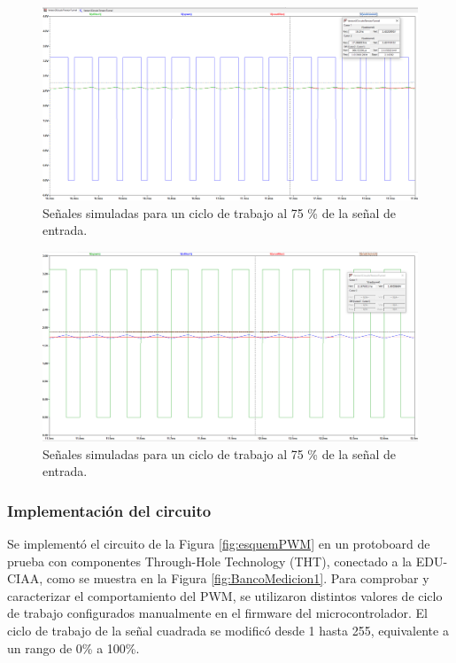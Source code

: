\begin{figure}[H]
    \centering
    \includegraphics[width=1.1\linewidth]{Figuras/datalogger/Hardware/pwm75Percent.png}
    \caption{Señales simuladas para un ciclo de trabajo al 75 \% de la señal de entrada.}
    \label{fig:pwm75Percent}
\end{figure}



\begin{figure}[H]
    \centering
    \includegraphics[width=1.1\linewidth]{Figuras/datalogger/Hardware/pwm55Percent.png}
    \caption{Señales simuladas para un ciclo de trabajo al 75 \% de la señal de entrada.}
    \label{fig:pwm55Percent}
\end{figure}


\subsubsection{Implementación del circuito}

Se implementó el circuito de la Figura \ref{fig:esquemPWM} en un protoboard de prueba con componentes Through-Hole Technology (THT), conectado a la EDU-CIAA, como se muestra en la Figura \ref{fig:BancoMedicion1}. Para comprobar y caracterizar el comportamiento del PWM, se utilizaron distintos valores de ciclo de trabajo configurados manualmente en el firmware del microcontrolador. El ciclo de trabajo de la señal cuadrada se modificó desde 1 hasta 255, equivalente a un rango de 0\% a 100\%.


